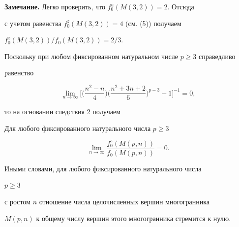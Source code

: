 {\bf Замечание.} Легко проверить, что $f^u_0(M(3,2)){=}2$. Отсюда


с учетом равенства $f^z_0(M(3,2)){=}4$ (см. (5)) получаем


$f^z_0(M(3,2))/f_0(M(3,2))=2/3$.





Поскольку при любом фиксированном натуральном числе $p\geq 3$ справедливо


равенство


$$


\lim_{n\to\infty}\bigg[\bigg(\frac{n^2-n}{4}\bigg)


\bigg(\frac{n^2+3n+2}{6}\bigg)^{p-3}+1\bigg]^{-1}=0,


$$


то на основании следствия 2 получаем





\begin{cor}


Для любого фиксированного натурального числа $p\geq 3$


$$


\lim_{n\to\infty}\frac{f^z_0(M(p,n))}{f_0(M(p,n))}=0.


$$


\end{cor}


\noindent Иными словами, для любого фиксированного натурального числа


$p\geq 3$


с ростом $n$ отношение числа целочисленных вершин многогранника


$M(p,n)$ к общему числу вершин этого многогранника стремится к нулю.





